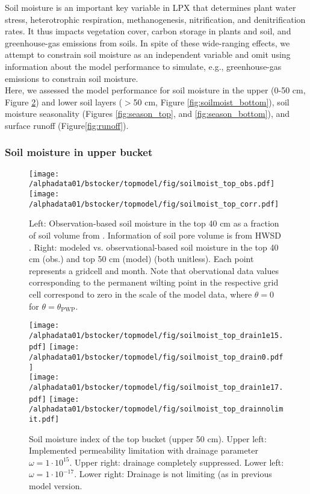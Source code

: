 Soil moisture is an important key variable in LPX that determines plant water stress, heterotrophic respiration, methanogenesis, nitrification, and denitrification rates. It thus impacts vegetation cover, carbon storage in plants and soil, and greenhouse-gas emissions from soils. In spite of these wide-ranging effects, we attempt to constrain soil moisture as an independent variable and omit using information about the model performance to simulate, e.g., greenhouse-gas emissions to constrain soil moisture.\\

Here, we assessed the model performance for soil moisture in the upper (0-50 cm, Figure \ref{fig:soilmoist_top}) and lower soil layers ($>$50 cm, Figure \ref{fig:soilmoist_bottom}), soil moisture seasonality (Figures \ref{fig:season_top}, and \ref{fig:season_bottom}), and surface runoff (Figure\ref{fig:runoff}). 

\clearpage 

\subsubsection{Soil moisture in upper bucket}

\begin{figure}[ht!]
\begin{center}
  \texttt{[image: /alphadata01/bstocker/topmodel/fig/soilmoist\_top\_obs.pdf]}
  \texttt{[image: /alphadata01/bstocker/topmodel/fig/soilmoist\_top\_corr.pdf]}
\end{center}
\caption{Left: Observation-based soil moisture in the top 40 cm as a fraction of soil volume from \citep{rodell04bams}. Information of soil pore volume is from HWSD \citep{hwsd}. Right: modeled vs. observational-based soil moisture in the top 40 cm (obs.) and top 50 cm (model) (both unitless). Each point represents a gridcell and month. Note that obervational data values corresponding to the permanent wilting point in the respective grid cell correspond to zero in the scale of the model data, where $\theta=0$ for $\theta=\theta_{\text{PWP}}$.}
\label{fig:soilmoist_top_obs}
\end{figure}

\begin{figure}[ht!]
\begin{center}
  \texttt{[image: /alphadata01/bstocker/topmodel/fig/soilmoist\_top\_drain1e15.pdf]}
  \texttt{[image: /alphadata01/bstocker/topmodel/fig/soilmoist\_top\_drain0.pdf]}\\
  \texttt{[image: /alphadata01/bstocker/topmodel/fig/soilmoist\_top\_drain1e17.pdf]}
  \texttt{[image: /alphadata01/bstocker/topmodel/fig/soilmoist\_top\_drainnolimit.pdf]}
\end{center}
\caption{Soil moisture index of the top bucket (upper 50 cm). Upper left: Implemented permeability limitation with drainage parameter $\omega=1\cdot 10^{15}$. Upper right: drainage completely suppressed. Lower left: $\omega=1\cdot 10^{-17}$. Lower right: Drainage is not limiting (as in previous model version.}
\label{fig:soilmoist_top}
\end{figure}

